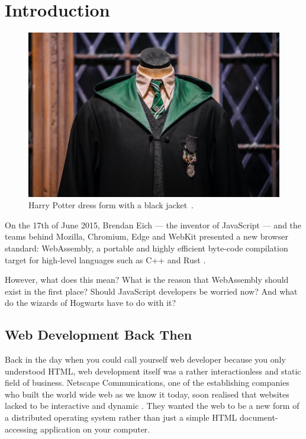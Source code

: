 \documentclass[10pt]{article}  %
\newcommand{\mycaption}[2]{\caption[#1.]{#1~\citep{#2}.}}
\begin{document}
\begin{sloppypar}


  \section{Introduction}
  \label{sec:introduction}

  \begin{figure}[ht]
    \centering
    \includegraphics[width=\textwidth]{figures/001.jpg}
    \mycaption{Harry Potter dress form with a black jacket}{unsplash_beautiful_2018}
    \label{fig:cover}
  \end{figure}

  On the 17th of June 2015, Brendan Eich — the inventor of JavaScript — and the teams behind Mozilla, Chromium, Edge and WebKit presented a new browser standard: WebAssembly, a portable and highly efficient byte-code compilation target for high-level languages such as C++ and Rust \citep{eich_asmjs_2015}.

  However, what does this mean? What is the reason that WebAssembly should exist in the first place? Should JavaScript developers be worried now? And what do the wizards of Hogwarts have to do with it?

  \subsection{Web Development Back Then}
  \label{sec:back-then}

  Back in the day when you could call yourself web developer because you only understood HTML, web development itself was a rather interactionless and static field of business. Netscape Communications, one of the establishing companies who built the world wide web as we know it today, soon realised that websites lacked to be interactive and dynamic \citep{cassel_brendan_2018}. They wanted the web to be a new form of a distributed operating system rather than just a simple HTML document-accessing application on your computer.


\end{sloppypar}
\end{document}
